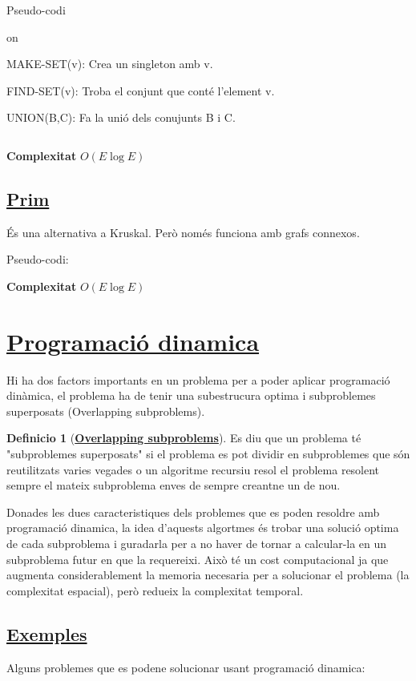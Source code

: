 \documentclass[12pt]{article}
\theoremstyle{definition}
\newtheorem{definicio}{Definicio}
\theoremstyle{definition}
\theoremstyle{definition}
\theoremstyle{definition}
\theoremstyle{definition}
\theoremstyle{definition}
\theoremstyle{definition}
\begin{document}
Pseudo-codi

on

MAKE-SET(v): Crea un singleton amb v.

FIND-SET(v): Troba el conjunt que conté l'element v.

UNION(B,C): Fa la unió dels conujunts B i C.

$\;$

\textbf{Complexitat} $O(E \log{E})$

\subsection{\href{https://tinyurl.com/hxku8vp}{\color{blue}Prim}}

És una alternativa a Kruskal. Però només funciona amb grafs connexos.

Pseudo-codi:


\textbf{Complexitat} $O(E\log{E})$

\newpage

\section{\href{https://tinyurl.com/vzdm4sq}{Programació dinamica}}

Hi ha dos factors importants en un problema per a poder aplicar programació dinàmica, el problema ha de tenir una subestrucura optima i subproblemes superposats (Overlapping subproblems).

\begin{definicio}[\href{https://tinyurl.com/ruw64sf}{\textbf{Overlapping subproblems}}]
Es diu que un problema té "subproblemes superposats" si  el problema es pot dividir en subproblemes que són reutilitzats varies vegades o un algoritme recursiu resol el problema resolent sempre el mateix subproblema enves de sempre creantne un de nou.
\end{definicio}

Donades les dues caracteristiques dels problemes que es poden resoldre amb programació dinamica, la idea d'aquests algortmes és trobar una solució optima de cada subproblema i guradarla per a no haver de tornar a calcular-la en un subproblema futur en que la requereixi. Això té un cost computacional ja que augmenta considerablement la memoria necesaria per a solucionar el problema (la complexitat espacial), però redueix la complexitat temporal.

\subsection{\href{https://tinyurl.com/wey838c}{Exemples}}
Alguns problemes que es podene solucionar usant programació dinamica:
\end{document}
